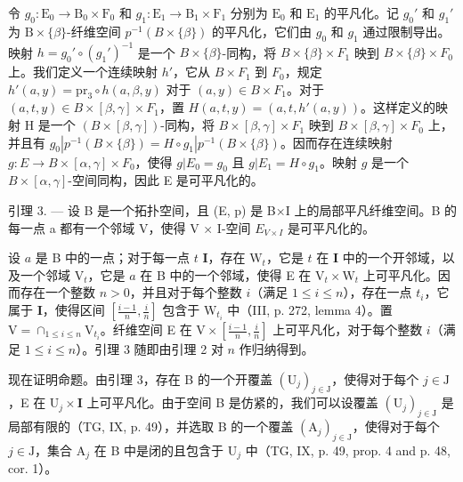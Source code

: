 令 \(g_0 \colon \mathrm{E}_0 \to \mathrm{B}_0 \times \mathrm{F}_0\) 和 \(g_1 \colon \mathrm{E}_1 \to \mathrm{B}_1 \times \mathrm{F}_1\) 分别为 \(\mathrm{E}_0\) 和 \(\mathrm{E}_1\) 的平凡化。记 \(g_0'\) 和 \(g_1'\) 为 \(\mathrm{B} \times \{\beta\}\)-纤维空间 \(p^{-1}(B \times \{\beta\})\) 的平凡化，它们由 \(g_0\) 和 \(g_1\) 通过限制导出。映射 \(h = g_0' \circ (g_1')^{-1}\) 是一个 \(B \times \{\beta\}\)-同构，将 \(B \times \{\beta\} \times F_1\) 映到 \(B \times \{\beta\} \times F_0\) 上。我们定义一个连续映射 \(h'\)，它从 \(B \times F_1\) 到 \(F_0\)，规定 \(h'(a, y) = \mathrm{pr}_3 \circ h(a, \beta, y)\) 对于 \((a, y) \in B \times F_1\)。对于 \((a, t, y) \in B \times [\beta, \gamma] \times F_1\)，置 \(H(a, t, y) = (a, t, h'(a, y))\)。这样定义的映射 H 是一个 \((B \times [\beta, \gamma])\)-同构，将 \(B \times [\beta, \gamma] \times F_1\) 映到 \(B \times [\beta, \gamma] \times F_0\) 上，并且有 \(g_0 | p^{-1}(B \times \{\beta\}) = H \circ g_1 | p^{-1}(B \times \{\beta\})\)。因而存在连续映射 \(g \colon E \to B \times [\alpha, \gamma] \times F_0\)，使得 \(g | E_0 = g_0\) 且 \(g | E_1 = H \circ g_1\)。映射 \(g\) 是一个 \(B \times [\alpha, \gamma]\)-空间同构，因此 E 是可平凡化的。

引理 3. --- 设 B 是一个拓扑空间，且 (E, p) 是 B×I 上的局部平凡纤维空间。B 的每一点 a 都有一个邻域 V，使得 V × I-空间 \(E_{V \times I}\) 是可平凡化的。

设 \(a\) 是 B 中的一点；对于每一点 \(t\) \(\mathbf{I}\)，存在 \(\mathrm{W}_t\)，它是 \(t\) 在 \(\mathbf{I}\) 中的一个开邻域，以及一个邻域 \(\mathrm{V}_t\)，它是 \(a\) 在 B 中的一个邻域，使得 E 在 \(\mathrm{V}_t \times \mathrm{W}_t\) 上可平凡化。因而存在一个整数 \(n > 0\)，并且对于每个整数 \(i\)（满足 \(1 \leqslant i \leqslant n\)），存在一点 \(t_i\)，它属于 \(\mathbf{I}\)，使得区间 \([\frac{i-1}{n}, \frac{i}{n}]\) 包含于 \(\mathrm{W}_{t_i}\) 中（III, p. 272, lemma 4）。置 \(\mathrm{V} = \cap_{1 \leqslant i \leqslant n} \mathrm{V}_{t_i}\)。纤维空间 E 在 \(\mathrm{V} \times [\frac{i-1}{n}, \frac{i}{n}]\) 上可平凡化，对于每个整数 \(i\)（满足 \(1 \leqslant i \leqslant n\)）。引理 3 随即由引理 2 对 \(n\) 作归纳得到。

现在证明命题。由引理 3，存在 B 的一个开覆盖 \((\mathrm{U}_j)_{j\in \mathrm{J}}\)，使得对于每个 \(j\in \mathrm{J}\)，E 在 \(\mathrm{U}_j\times \mathbf{I}\) 上可平凡化。由于空间 B 是仿紧的，我们可以设覆盖 \((\mathrm{U}_j)_{j\in \mathrm{J}}\) 是局部有限的（TG, IX, p. 49），并选取 B 的一个覆盖 \((\mathrm{A}_j)_{j\in \mathrm{J}}\)，使得对于每个 \(j\in \mathrm{J}\)，集合 \(\mathrm{A}_j\) 在 B 中是闭的且包含于 \(\mathrm{U}_j\) 中（TG, IX, p. 49, prop. 4 and p. 48, cor. 1）。

